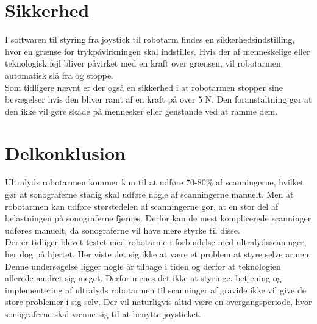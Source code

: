 \section{Sikkerhed}
I softwaren til styring fra joystick til robotarm findes en sikkerhedsindstilling, hvor en grænse for trykpåvirkningen skal indstilles. Hvis der af menneskelige eller teknologisk fejl bliver påvirket med en kraft over grænsen, vil robotarmen automatisk slå fra og stoppe. \\
Som tidligere nævnt er der også en sikkerhed i at robotarmen stopper sine bevægelser hvis den bliver ramt af en kraft på over 5 N. Den foranstaltning gør at den ikke vil gøre skade på mennesker eller genstande ved at ramme dem. 

\section{Delkonklusion}
Ultralyds robotarmen kommer kun til at udføre 70-80\% af scanningerne, hvilket gør at sonograferne stadig skal udføre nogle af scanningerne manuelt. Men at robotarmen kan udføre størstedelen af scanningerne gør, at en stor del af belastningen på sonograferne fjernes. Derfor kan de mest komplicerede scanninger udføres manuelt, da sonograferne vil have mere styrke til disse.\\

Der er tidliger blevet testet med robotarme i forbindelse med ultralydsscaninger, her dog på hjertet. Her viste det sig ikke at være et problem at styre selve armen.  Denne undersøgelse ligger nogle år tilbage i tiden og derfor at teknologien allerede ændret sig meget. Derfor menes det ikke at styringe, betjening og implementering af ultralyds robotarmen til scanninger af gravide ikke vil give de store problemer i sig selv. Der vil naturligvis altid være en overgangsperiode, hvor sonograferne skal vænne sig til at benytte joysticket. 